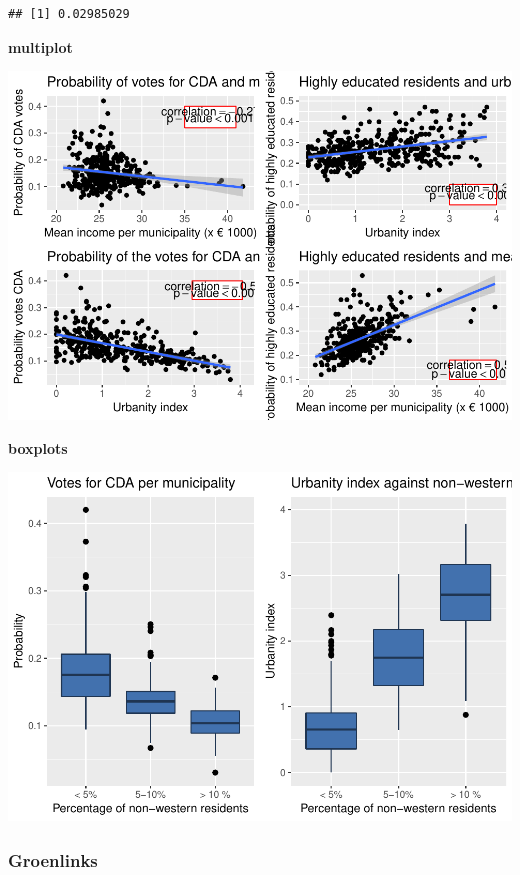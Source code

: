 \documentclass[11pt,]{article}
\begin{document}
\begin{verbatim}
## [1] 0.02985029
\end{verbatim}

\textbf{multiplot}

\begin{center}\includegraphics{Report_files/figure-latex/multi_plots-1} \end{center}

\textbf{boxplots}

\begin{center}\includegraphics{Report_files/figure-latex/multi_boxplots-1} \end{center}

\subsubsection{Groenlinks}\label{groenlinks}
\end{document}
